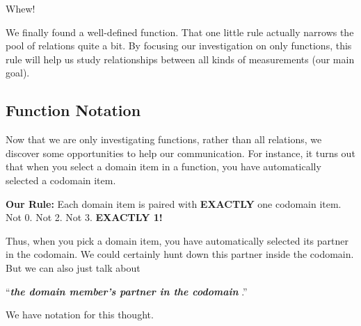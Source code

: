 \documentclass{ximera}
\begin{document}
Whew!  

We finally found a well-defined function. That one little rule actually narrows the pool of relations quite a bit.  By focusing our investigation on only functions, this rule will help us study relationships between all kinds of measurements (our main goal). 












\subsection*{Function Notation}

Now that we are only investigating functions, rather than all relations, we discover some opportunities to help our communication.  For instance, it turns out that when you select a domain item in a function, you have automatically selected a codomain item.

\textbf{Our Rule:} Each domain item is paired with \textbf{\textcolor{purple!85!blue}{EXACTLY}} one codomain item.  Not 0. Not 2.  Not 3.  \textbf{\textcolor{purple!85!blue}{EXACTLY 1!}}


Thus, when you pick a domain item, you have automatically selected its partner in the codomain.  We could certainly hunt down this partner inside the codomain.  But we can also just talk about 






\begin{center}
``\textit{\textbf{\textcolor{blue!55!black}{the domain member's partner in the codomain}} }.'' 
\end{center}



We have notation for this thought. 


\newpage
\end{document}
